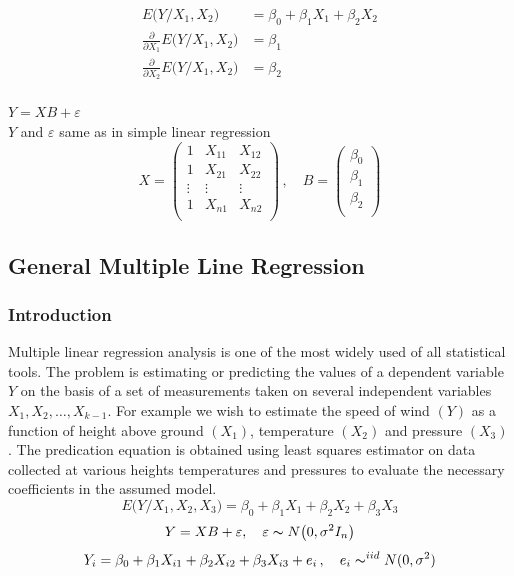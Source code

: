 \documentclass[11pt,a4paper]{article}
\theoremstyle{definition}
\begin{document}
\begin{align*}
E\big(Y/X_1,X_2\big) & = \beta_0+\beta_1X_1+\beta_2X_2\\
\frac{\partial}{\partial X_1}E\big(Y/X_1,X_2\big) & = \beta_1\\
\frac{\partial}{\partial X_2}E\big(Y/X_1,X_2\big) & = \beta_2\\
\end{align*}

$Y=XB+\varepsilon$\\
$Y$ and $\varepsilon$ same as in simple linear regression
$$X=
\begin{pmatrix}
1 & X_{11} & X_{12}\\
1 & X_{21} & X_{22}\\
\vdots & \vdots & \vdots \\
1 & X_{n1} & X_{n2}\\
\end{pmatrix}
\,,\quad  B=
\begin{pmatrix}
\beta_0\\
\beta_1\\
\beta_2\\
\end{pmatrix}
$$


     
     
     
     
     
     
\subsection{General Multiple Line Regression}


\subsubsection*{Introduction}
Multiple linear regression analysis is one of the most widely used of all statistical tools. The problem is estimating or predicting the values of a dependent variable $Y$ on the basis of a  set of  measurements taken on several independent variables $X_1,X_2,\ldots ,X_{k-1}$. For example we wish to estimate the speed of wind $(Y)$ as a function of height above ground $(X_1)$, temperature $(X_2)$ and pressure $(X_3)$. The predication  equation is obtained using least squares estimator on data collected at various heights temperatures and pressures to evaluate the necessary coefficients in the assumed model.
$$E\big(Y/X_1,X_2,X_3\big)=\beta_0+\beta_1X_1+\beta_2X_2+\beta_3X_3$$
$$Y=XB+\varepsilon,\quad  \varepsilon \thicksim N\big(0,\sigma^2 I_n\big)$$
$$Y_i=\beta_0+\beta_1X_{i1}+\beta_2X_{i2}+\beta_3X_{i3}+e_i\,,\quad  e_i\thicksim^{iid}N(0,\sigma^2)$$
\end{document}
